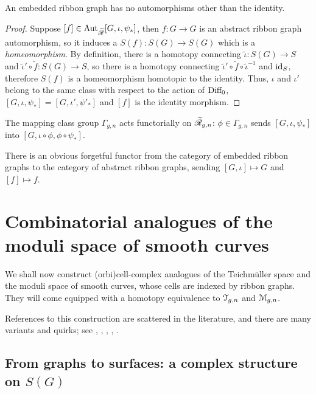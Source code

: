 \begin{lemma}
  \label{lemma:erg-no-aut}
  An embedded ribbon graph has no automorphisms other than the identity.
\end{lemma}
\begin{proof}
  Suppose $[f] \in \Aut_{\ERG}[G, \iota, \psi_*]$, then $f:G\to G$ is an abstract
  ribbon graph automorphism, so it induces a $S(f): S(G) \to S(G)$
  which is a \emph{homeomorphism}.  By definition, there is a homotopy
  connecting ${\tilde \iota}: S(G) \to S$ and ${\tilde \iota'} \circ {\tilde f}:
  S(G)\to S$, so there is a homotopy connecting ${\tilde \iota'} \circ {\tilde f}
  \circ {\tilde \iota}^{-1}$ and $\id_S$, therefore $S(f)$ is a
  homeomorphism homotopic to the identity.  Thus, $\iota$ and $\iota'$ belong
  to the same class with respect to the action of $\Diff_0$, $[G, \iota,
  \psi_*] = [G, \iota', \psi'_*]$ and $[f]$ is the identity morphism.
\end{proof}

The mapping class group $\Gamma_{g,n}$ acts functorially on $\ERG[g,n]$: $\phi
\in \Gamma_{g,n}$ sends $[G, \iota, \psi_*]$ into $[G, \iota \circ \phi, \phi \circ \psi_*]$.

There is an obvious forgetful functor from the category of embedded
ribbon graphs to the category of abstract ribbon graphs, sending $[G,
\iota] \mapsto G$ and $[f] \mapsto f$.



\section{Combinatorial analogues of the moduli space of smooth curves}
\label{sec:mgn-comb}

We shall now construct (orbi)cell-complex analogues of the Teichm\"uller
space and the moduli space of smooth curves, whose cells are indexed
by ribbon graphs.  They will come equipped with a homotopy
equivalence to $\T_{g,n}$ and $\M_{g,n}$.

References to this construction are scattered in the literature, and
there are many variants and quirks; see
\cite{harer;cohomology-of-moduli},
\cite{harer;cohomological-dimension},
\cite{kontsevich;intersection-theory;1992},
\cite{looijenga;cellular-decomposition},
\cite{penner:math.GT/0210326}.


\subsection{From graphs to surfaces: a complex structure on $S(G)$}
\label{sec:atlas}

